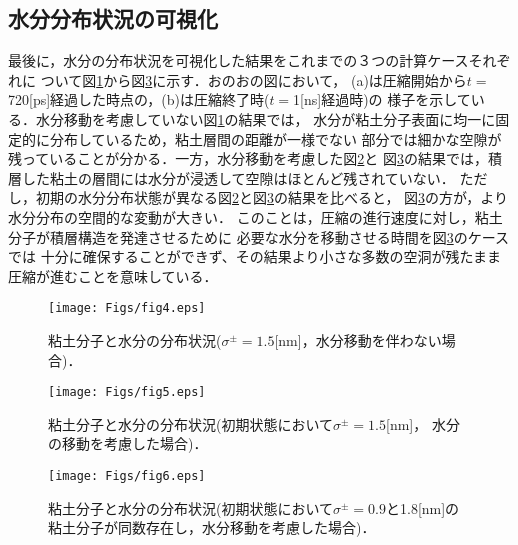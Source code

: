﻿\documentclass[11pt,a4j]{jarticle}
\begin{document}
\subsection{水分分布状況の可視化}
最後に，水分の分布状況を可視化した結果をこれまでの３つの計算ケースそれぞれに
ついて図\ref{fig:fig5}から図\ref{fig:fig7}に示す．おのおの図において，
(a)は圧縮開始から$t=$720[ps]経過した時点の，(b)は圧縮終了時($t=$1[ns]経過時)の
様子を示している．水分移動を考慮していない図\ref{fig:fig5}の結果では，
水分が粘土分子表面に均一に固定的に分布しているため，粘土層間の距離が一様でない
部分では細かな空隙が残っていることが分かる．一方，水分移動を考慮した図\ref{fig:fig6}と
図\ref{fig:fig7}の結果では，積層した粘土の層間には水分が浸透して空隙はほとんど残されていない．
ただし，初期の水分分布状態が異なる図\ref{fig:fig6}と図\ref{fig:fig7}の結果を比べると，
図\ref{fig:fig7}の方が，より水分分布の空間的な変動が大きい．
このことは，圧縮の進行速度に対し，粘土分子が積層構造を発達させるために
必要な水分を移動させる時間を図\ref{fig:fig7}のケースでは
十分に確保することができず、その結果より小さな多数の空洞が残たまま
圧縮が進むことを意味している．
\begin{figure}[h]
	\begin{center}
	\texttt{[image: Figs/fig4.eps]} 
	\end{center}
	\caption{
		粘土分子と水分の分布状況($\sigma^\pm=1.5$[nm]，水分移動を伴わない場合)．
	} 
	\label{fig:fig5}
\end{figure}
\begin{figure}[h]
	\begin{center}
	\texttt{[image: Figs/fig5.eps]} 
	\end{center}
	\caption{
		粘土分子と水分の分布状況(初期状態において$\sigma^\pm=1.5$[nm]，
		水分の移動を考慮した場合)．
	} 
	\label{fig:fig6}
\end{figure}
\begin{figure}[h]
	\begin{center}
	\texttt{[image: Figs/fig6.eps]} 
	\end{center}
	\caption{
		粘土分子と水分の分布状況(初期状態において$\sigma^\pm=0.9$と1.8[nm]の
		粘土分子が同数存在し，水分移動を考慮した場合)．
	} 
	\label{fig:fig7}
\end{figure}
\end{document}
